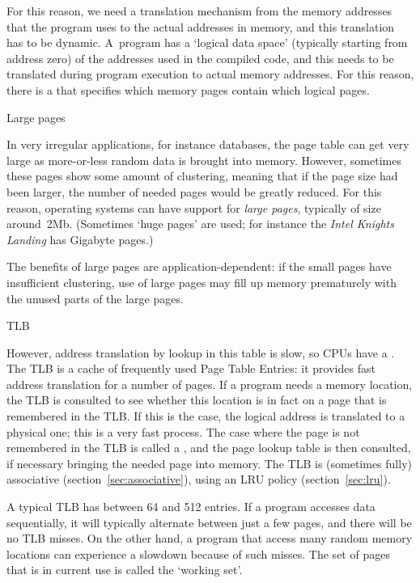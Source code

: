 For this reason, we need a translation mechanism from the memory
addresses that the program uses to the actual addresses in memory, and
this translation has to be dynamic. A~program has a `logical data
space' (typically starting from address zero) of the addresses used in
the compiled code, and this needs to be translated during program
execution to actual memory addresses. For this reason, there is a
 that specifies which memory pages contain which
logical pages.

 {Large pages}


In very irregular applications, for instance databases, the page table
can get very large as more-or-less random data is brought into
memory. However, sometimes these pages show some amount of clustering,
meaning that if the page size had been larger, the number of needed
pages would be greatly reduced. For this reason, operating systems can
have support for \emph{large pages},
typically of size around~2Mb. (Sometimes `huge pages' are used; for
instance the
\emph{Intel Knights Landing}
has Gigabyte pages.)

The benefits of large pages are application-dependent: if the small
pages have insufficient clustering, use of large pages may fill up
memory prematurely with the unused parts of the large pages.

 {TLB}
\label{sec:tlb}

However, address translation by lookup in this table is slow, so \acp{CPU}
have a .
The \ac{TLB} is a cache of frequently used 
Page Table Entries: it provides fast address translation for a number
of pages. If a program needs a memory
location, the \ac{TLB} is consulted to see whether this location is in fact
on a page that is remembered in the \ac{TLB}. 
If this is the case, the logical address is
translated to a physical one; this is a very fast process. The case
where the page is not remembered in the \ac{TLB} is called a
, and the page lookup table is then consulted,
if necessary bringing the needed page into memory.
The \ac{TLB} is (sometimes fully) associative
(section~\ref{sec:associative}), using an LRU policy
(section~\ref{sec:lru}).

A typical \ac{TLB} has between 64 and 512 entries. If a program accesses
data sequentially, it will typically alternate between just a few
pages, and there will be no \ac{TLB} misses. On the other hand, a program
that access many random memory locations can experience a slowdown
because of such misses. The set of pages that is in current use is
called the `working set'.

